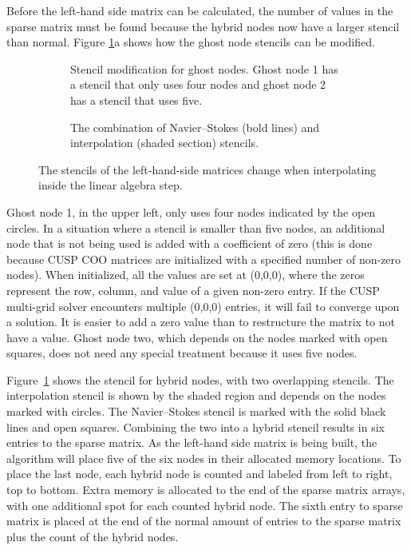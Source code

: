 \documentclass[preprint,12pt]{elsarticle}
\begin{document}
Before the left-hand side matrix can be calculated, the number of values in the sparse matrix must be found because the hybrid nodes now have a larger stencil than normal.
Figure \ref{fig:ID combined stencil}a shows how the ghost node stencils can be modified.
\begin{figure}[!htb]
	\centering
	\begin{subfigure}{0.5\textwidth}
		
		\caption{Stencil modification for ghost nodes. Ghost node 1 has a stencil that only uses four nodes and ghost node 2 has a stencil that uses five.}
	\end{subfigure}

	\begin{subfigure}{0.5\textwidth}
		
		\caption{The combination of Navier--Stokes (bold lines) and interpolation (shaded section) stencils.}
	\end{subfigure}
	\caption{The stencils of the left-hand-side matrices change when interpolating inside the linear algebra step.}
	\label{fig:ID combined stencil}
\end{figure}
Ghost node 1, in the upper left, only uses four nodes indicated by the open circles.
In a situation where a stencil is smaller than five nodes, an additional node that is not being used is added with a coefficient of zero (this is done because CUSP COO matrices are initialized with a specified number of non-zero nodes).
When initialized, all the values are set at (0,0,0), where the zeros represent the row, column, and value of a given non-zero entry.
If the CUSP multi-grid solver encounters multiple (0,0,0) entries, it will fail to converge upon a solution.
It is easier to add a zero value than to restructure the matrix to not have a value.
Ghost node two, which depends on the nodes marked with open squares, does not need any special treatment because it uses five nodes.

Figure~\ref{fig:ID combined stencil} shows the stencil for hybrid nodes, with two overlapping stencils.
The interpolation stencil is shown by the shaded region and depends on the nodes marked with circles.
The Navier--Stokes stencil is marked with the solid black lines and open squares.
Combining the two into a hybrid stencil results in six entries to the sparse matrix.
As the left-hand side matrix is being built, the algorithm will place five of the six nodes in their allocated memory locations.
To place the last node, each hybrid node is counted and labeled from left to right, top to bottom.
Extra memory is allocated to the end of the sparse matrix arrays, with one additional spot for each counted hybrid node.
The sixth entry to sparse matrix is placed at the end of the normal amount of entries to the sparse matrix plus the count of the hybrid nodes.
\end{document}
